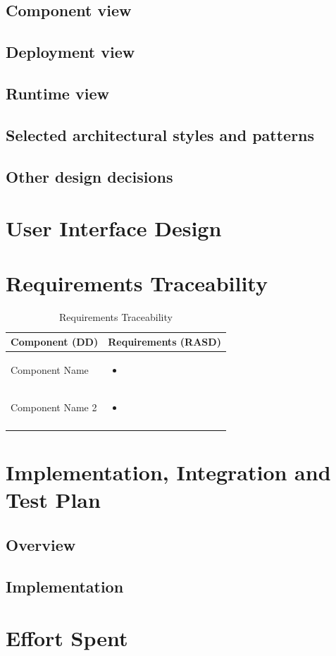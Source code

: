 \documentclass{article}
\begin{document}
		
	\subsection{Component view}
	
		
	\subsection{Deployment view}
	
		
	\subsection{Runtime view}
	
	
	\subsection{Selected architectural styles and patterns}
	
	
	\subsection{Other design decisions}
	

\section{User Interface Design}

\section{Requirements Traceability}
	
	\begin{longtable}{| p{5 cm} | p{8 cm} |} \hline
		Component (DD) & Requirements (RASD)  \\ \hline
		\newline Component Name & 
		\begin{itemize}
			\item 
		\end{itemize}	\\ \hline
		\newline Component Name 2 & 
		\begin{itemize}
			\item  
		\end{itemize}		\\	 \hline				
		\caption{Requirements Traceability}	
		
	\end{longtable}
	
	
\section{Implementation, Integration and Test Plan}
	\subsection{Overview}
		
	\subsection{Implementation}
	
		
\section{Effort Spent}
	
	
\end{document}
